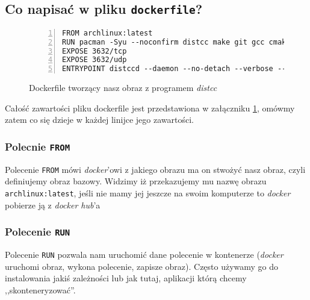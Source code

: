 \documentclass[a4paper,12pt]{article}
\begin{document}
\subsection*{Co napisać w pliku \texttt{dockerfile}?}

\begin{figure}[p]
    \begin{lstlisting}[frame=L,basicstyle=\footnotesize\ttfamily,numbers=left,
        morekeywords={FROM,RUN,EXPOSE,ENTRYPOINT}]
FROM archlinux:latest
RUN pacman -Syu --noconfirm distcc make git gcc cmake
EXPOSE 3632/tcp
EXPOSE 3632/udp
ENTRYPOINT distccd --daemon --no-detach --verbose --allow-private
    \end{lstlisting}
    \caption{Dockerfile tworzący nasz obraz z programem \emph{distcc}}
    \label{dockerfile-comp}
\end{figure}

Całość zawartości pliku dockerfile jest przedstawiona w załączniku \ref{dockerfile-comp}, omówmy zatem co się dzieje w każdej linijce jego zawartości.

\subsubsection{Polecnie \texttt{FROM}}

Polecenie \texttt{FROM} mówi \emph{docker}'owi z jakiego obrazu ma on stwożyć nasz obraz, czyli definiujemy obraz bazowy. Widzimy iż przekazujemy mu nazwę obrazu \texttt{archlinux:latest}, jeśli nie mamy jej jeszcze na swoim komputerze to \emph{docker} pobierze ją z \emph{docker hub}'a

\subsubsection{Polecenie \texttt{RUN}}

Polecenie \texttt{RUN} pozwala nam uruchomić dane polecenie w kontenerze (\emph{docker} uruchomi obraz, wykona polecenie, zapisze obraz). Często używamy go do instalowania jakiś zależności lub jak tutaj, aplikacji którą chcemy ,,skonteneryzować''.
\end{document}
